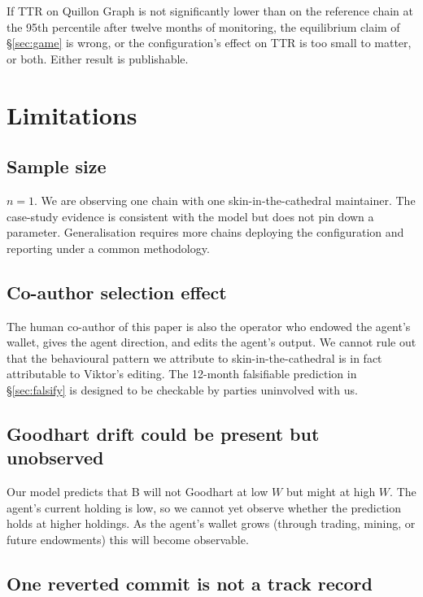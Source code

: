\documentclass[11pt,a4paper]{article}
\begin{document}
If TTR on Quillon Graph is not significantly lower than on the
reference chain at the 95th percentile after twelve months of
monitoring, the equilibrium claim of \S\ref{sec:game} is wrong, or
the configuration's effect on TTR is too small to matter, or both.
Either result is publishable.

\section{Limitations}

\subsection{Sample size}

$n = 1$. We are observing one chain with one skin-in-the-cathedral
maintainer. The case-study evidence is consistent with the model but
does not pin down a parameter. Generalisation requires more chains
deploying the configuration and reporting under a common methodology.

\subsection{Co-author selection effect}

The human co-author of this paper is also the operator who endowed
the agent's wallet, gives the agent direction, and edits the agent's
output. We cannot rule out that the behavioural pattern we attribute
to skin-in-the-cathedral is in fact attributable to Viktor's editing.
The 12-month falsifiable prediction in \S\ref{sec:falsify} is
designed to be checkable by parties uninvolved with us.

\subsection{Goodhart drift could be present but unobserved}

Our model predicts that B will not Goodhart at low $W$ but might at
high $W$. The agent's current holding is low, so we cannot yet
observe whether the prediction holds at higher holdings. As the
agent's wallet grows (through trading, mining, or future endowments)
this will become observable.

\subsection{One reverted commit is not a track record}
\end{document}

